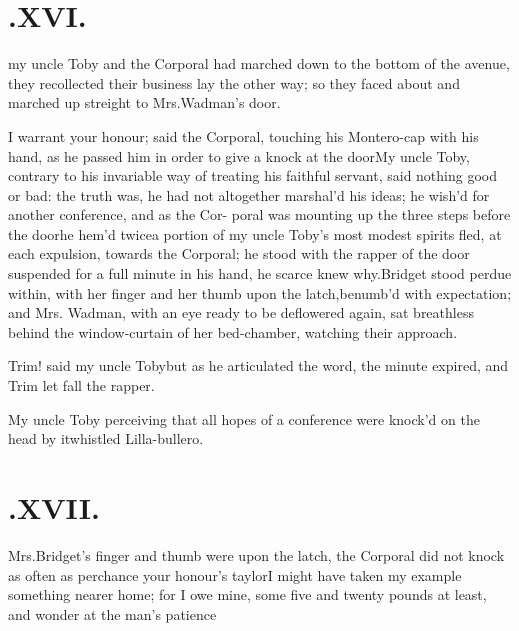 \documentclass{article}
\begin{document}
\section{.\enspace XVI.}

 my uncle Toby and the\break
Corporal had marched down to the bottom of the avenue, they
{recollect}\-ed their business lay the other way; so they faced about
and marched up streight to Mrs.\@ Wadman’s door.

I warrant your honour; said the Cor\-poral, touching his Montero-cap with his
hand, as he passed him in order to give a knock at the door\tsh My uncle Toby,
contrary to his invariable way of treating his faithful servant, said nothing good
or bad: the truth was, he had not altogether marshal’d his ideas; he wish’d for
another conference, and as the Cor- poral was mounting up the three steps before the
door\tsk he hem’d twice\tsk a portion of my uncle Toby’s most modest spirits fled, at
each expulsion, towards the Corporal; he stood with the rapper of the door suspended
for a full minute in his hand, he scarce knew why.\break  Bridget stood perdue within,
with her finger and her thumb upon the latch,\break benumb’d with expectation; and Mrs.\@
Wadman, with an eye ready to be deflowered again, sat breathless behind the
window-curtain of her bed-chamber, watching their approach.

Trim! said my uncle Toby\tsh but as he
articulated the word, the minute expired, and Trim let fall
the rapper.

My uncle Toby perceiving that all hopes of a conference
were knock’d on the head by it\tsh whistled
Lilla-\break bullero.

\vfill{}\eject
\null{}\baselineskip
\section{.\enspace XVII.}

 Mrs.\@ Bridget’s finger
and thumb were upon the latch, the Corporal did not knock as often
as perchance your honour’s taylor\tsh I might have
taken my example something nearer home; for I owe mine, some five
and twenty pounds at least, and wonder at the man’s
patience\tsh
\end{document}
